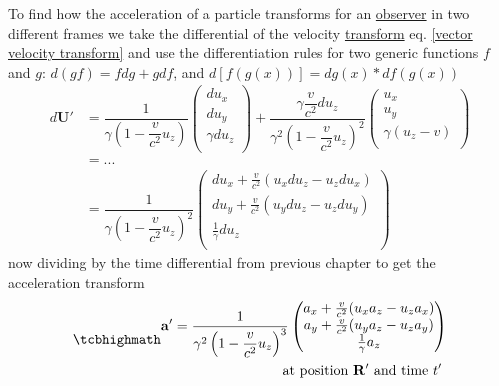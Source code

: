 To find how the acceleration of a particle transforms for an \hyperlink{def-observer}{observer} in two different frames we take the differential of the velocity \hyperlink{def-transform}{transform} eq. \eqref{vector velocity transform} and use the differentiation rules for two generic functions $f$ and $g$: $d(gf)=f dg+g df$, and $d[f(g(x))]= dg(x) * df(g(x))$ 
\begin{equation}%
\begin{aligned}
     d\mathbf{U'} &= \dfrac{1}{\gamma\left(1- \dfrac{v}{c^2} u_z\right) }\begin{pmatrix}
    du_x \\ du_y  \\ \gamma du_z  \\
    \end{pmatrix} + \dfrac{\gamma \dfrac{v}{c^2} du_z}{\gamma^2\left(1- \dfrac{v}{c^2} u_z\right)^2 }\begin{pmatrix}
    u_x \\ u_y  \\ \gamma \left( u_z  - v  \right) \\
    \end{pmatrix}  \\
    &= ... \\
    &=  \dfrac{1}{\gamma\left(1- \dfrac{v}{c^2} u_z\right)^2 }\begin{pmatrix}
    du_x + \frac{v}{c^2}( u_x du_z - u_z du_x) \\ du_y + \frac{v}{c^2}( u_y du_z - u_z du_y) \\ \frac{1}{\gamma} du_z \\
    \end{pmatrix}
\end{aligned}      
\end{equation}%
now dividing by the time differential from previous chapter to get the acceleration transform
\begin{equation}%
\mhl{
\begin{aligned}
     \mathbf{a'} =  \dfrac{1}{\gamma^2\left(1- \dfrac{v}{c^2} u_z\right)^3 }\begin{pmatrix}
    a_x + \frac{v}{c^2}(u_x a_z - u_z a_x) \\ a_y + \frac{v}{c^2}(u_y a_z - u_z a_y) \\ \frac{1}{\gamma} a_z \\
    \end{pmatrix}
    \\
    \text{at position $\mathbf{R'}$ and time $t'$ } 
\end{aligned}   
    }
\end{equation}%

